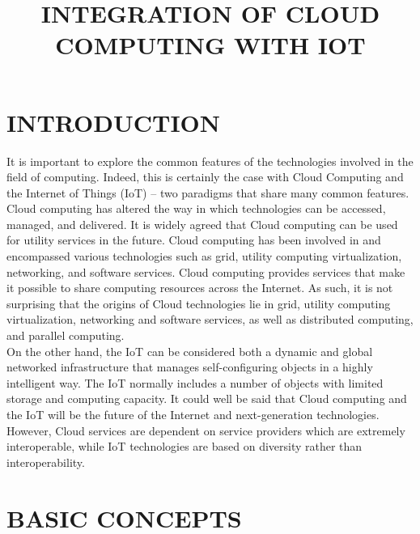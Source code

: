 \documentclass[11pt]{article}
\title{INTEGRATION OF CLOUD COMPUTING WITH IOT}
\date{} %
\begin{document}
\maketitle
\section{INTRODUCTION}
It is important to explore the common features of the
technologies involved in the field of computing. Indeed, this is certainly the case with Cloud Computing and the Internet of
Things (IoT) – two paradigms that share many common
features. Cloud computing has altered the way in which technologies can be accessed, managed, and delivered. It is widely agreed that Cloud computing can be used for utility services in the future. Cloud computing has been involved in and encompassed various technologies such as grid, utility
computing virtualization, networking, and software services. Cloud computing provides services that make it possible
to share computing resources across the Internet. As such, it is not surprising that the origins of Cloud technologies lie in grid, utility computing virtualization, networking and software services, as well as distributed computing, and parallel computing.\\ On the other hand, the IoT can be considered both a dynamic and global networked infrastructure that manages self-configuring objects in a highly intelligent way. The IoT normally includes a number of objects with limited storage and computing capacity. It could well be said that Cloud computing and the IoT will be the future of the Internet and next-generation technologies. However, Cloud services are dependent on service providers which are extremely
interoperable, while IoT technologies are based on diversity
rather than interoperability.
 

\section{BASIC CONCEPTS}
\end{document}
